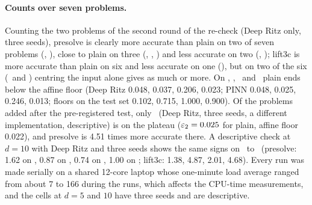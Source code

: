 \paragraph{Counts over seven problems.} Counting the two problems of the second round of the
re-check (Deep Ritz only, three seeds), presolve is clearly more accurate than plain on two of
seven problems (\Pone, \Pexpcos), close to plain on three (\Ptwo, \Pcospair, \Psinlin) and less
accurate on two (\Pridge, \Paltridge); lift3c is more accurate than plain on six and less accurate
on one (\Paltridge), but on two of the six (\Pridge\ and \Psinlin) centring the input alone gives
as much or more.
On \Pone, \Pridge, \Pcospair\ and \Paltridge\ plain ends below the affine floor (Deep Ritz 0.048,
0.037, 0.206, 0.023; PINN 0.048, 0.025, 0.246, 0.013; floors on the test set 0.102, 0.715, 1.000,
0.900).
Of the problems added after the pre-registered test, only \Pexpcos\ (Deep Ritz, three seeds, a
different implementation, descriptive) is on the plateau ($\varepsilon_{2}=0.025$ for plain, affine floor
0.022), and presolve is 4.51 times more accurate there.
A descriptive check at $d=10$ with Deep Ritz and three seeds shows the same signs on \Pone\ to
\Pcospair\ (presolve: 1.62 on \Pone, 0.87 on \Ptwo, 0.74 on \Pridge, 1.00 on \Pcospair; lift3c:
1.38, 4.87, 2.01, 4.68).
Every run was made serially on a shared 12-core laptop whose one-minute load average ranged from
about 7 to 166 during the runs, which affects the CPU-time measurements, and the cells at $d=5$ and
$10$ have three seeds and are descriptive.
